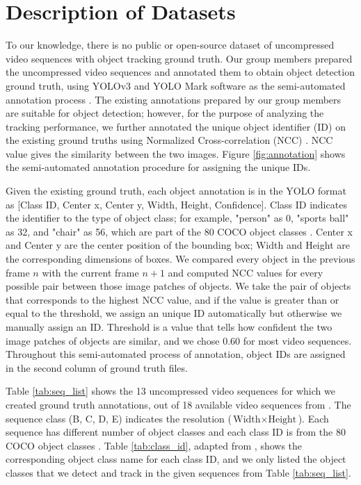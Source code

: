 \section{Description of Datasets}
\label{sec:methods/section_a}

To our knowledge, there is no public or open-source dataset of uncompressed video sequences with object tracking ground truth. Our group members prepared the uncompressed video sequences and annotated them to obtain object detection ground truth, using YOLOv3 \cite{redmon_yolov3_2018} and YOLO Mark software \cite{alexey_alexeyabyolo_mark_2021} as the semi-automated annotation process \cite{choi_vcm_2020}. The existing annotations prepared by our group members are suitable for object detection; however, for the purpose of analyzing the tracking performance, we further annotated the unique object identifier (ID) on the existing ground truths using Normalized Cross-correlation (NCC) \cite{zhao_image_2006}. NCC value gives the similarity between the two images. Figure \ref{fig:annotation} shows the semi-automated annotation procedure for assigning the unique IDs.

Given the existing ground truth, each object annotation is in the YOLO format as [Class ID, Center x, Center y, Width, Height, Confidence]. Class ID indicates the identifier to the type of object class; for example, "person" as 0, "sports ball" as 32, and "chair" as 56, which are part of the 80 COCO object classes \cite{lin_microsoft_2014}. Center x and Center y are the center position of the bounding box; Width and Height are the corresponding dimensions of boxes. We compared every object in the previous frame $n$ with the current frame $n+1$ and computed NCC values for every possible pair between those image patches of objects. We take the pair of objects that corresponds to the highest NCC value, and if the value is greater than or equal to the threshold, we assign an unique ID automatically but otherwise we manually assign an ID. Threshold is a value that tells how confident the two image patches of objects are similar, and we chose 0.60 for most video sequences. Throughout this semi-automated process of annotation, object IDs are assigned in the second column of ground truth files.

Table \ref{tab:seq_list} shows the 13 uncompressed video sequences for which we created ground truth annotations, out of 18 available video sequences from \cite{choi_vcm_2020}. The sequence class (B, C, D, E) indicates the resolution ($\text{Width} \times \text{Height}$). Each sequence has different number of object classes and each class ID is from the 80 COCO object classes \cite{lin_microsoft_2014}. Table \ref{tab:class_id}, adapted from \cite{choi_vcm_2020}, shows the corresponding object class name for each class ID, and we only listed the object classes that we detect and track in the given sequences from Table \ref{tab:seq_list}.
